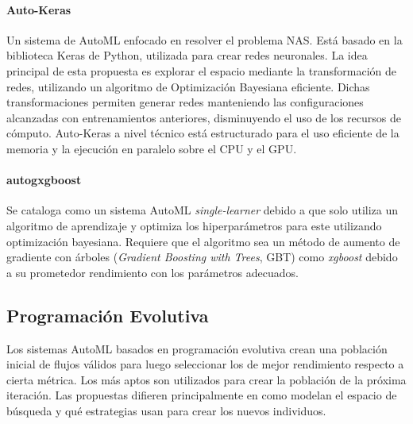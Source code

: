 \paragraph*{Auto-Keras } Un sistema de AutoML enfocado en resolver el problema NAS. Est\'a basado en la biblioteca Keras de Python, utilizada para crear redes neuronales.  La idea principal de esta propuesta es explorar el espacio mediante la transformaci\'on de redes, utilizando un algoritmo de Optimizaci\'on Bayesiana eficiente. Dichas transformaciones permiten generar redes manteniendo las configuraciones alcanzadas con entrenamientos anteriores, disminuyendo el uso de los recursos de c\'omputo. Auto-Keras a nivel t\'ecnico est\'a estructurado para el uso eficiente de la memoria y la ejecuci\'on en paralelo sobre el CPU y el GPU.

\paragraph*{autogxgboost } Se cataloga como un sistema AutoML \textit {single-learner} debido a que solo utiliza un algoritmo de aprendizaje y optimiza los hiperpar\'ametros para este utilizando optimizaci\'on bayesiana. Requiere que el algoritmo sea un m\'etodo de aumento de gradiente con \'arboles (\textit{Gradient Boosting with Trees}, GBT) como \textit {xgboost}  debido a su prometedor rendimiento con los par\'ametros adecuados.   
    
\subsection{Programaci\'on Evolutiva}
     Los sistemas AutoML basados en programaci\'on evolutiva crean una poblaci\'on inicial de flujos v\'alidos para luego seleccionar los de mejor rendimiento respecto a cierta m\'etrica. Los m\'as aptos son utilizados para crear la poblaci\'on de la pr\'oxima iteraci\'on. Las propuestas difieren principalmente en como modelan el espacio de b\'usqueda y qu\'e estrategias usan para crear los nuevos individuos.
     
